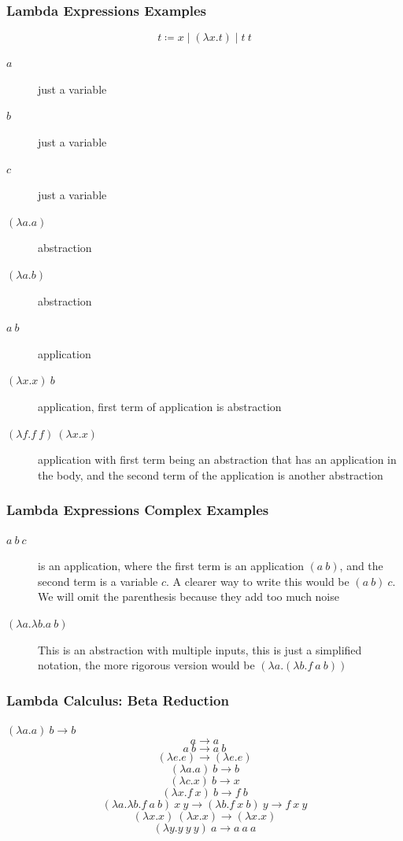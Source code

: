 \documentclass{beamer}
\begin{document}
\begin{frame}[fragile]
  \frametitle{Lambda Expressions Examples}

  $$ t \coloneqq x  \mid  (\lambda x . t)  \mid   t\  t $$

  \begin{description}
    \item[$a$] just a variable
    \item[$b$] just a variable
    \item[$c$] just a variable
    \item[$(\lambda a . a)$] abstraction
    \item[$(\lambda a . b)$] abstraction
    \item[$a\ b$] application
    \item[$(\lambda x . x)\ b$] application, first term of application is abstraction
    \item[$(\lambda f . f\ f)\ (\lambda x . x)$] application with first term being an abstraction that has an application in the body, and the second term of the application is another abstraction
  \end{description}
\end{frame}

\begin{frame}[fragile]
  \frametitle{Lambda Expressions Complex Examples}

  \begin{description}
    \item[$ a\ b\ c $] is an application, where the first term is an application $(a\ b)$, and the second term is a variable $c$. A clearer way to write this would be  $(a\ b)\ c$. We will omit the parenthesis because they add too much noise
    \item[$(\lambda a . \lambda b . a\ b) $] This is an abstraction with multiple inputs, this is just a simplified notation, the more rigorous version would be $(\lambda a . (\lambda b . f\ a\ b))$
  \end{description}
\end{frame}

\begin{frame}[fragile]
  \frametitle{Lambda Calculus: Beta Reduction}
  $(\lambda a . a)\ b \rightarrow b$
  $$ a \rightarrow a $$
  $$ a\ b \rightarrow a\ b$$
  $$ (\lambda e . e) \rightarrow (\lambda e . e) $$
  $$ (\lambda a . a)\ b \rightarrow b$$
  $$ (\lambda c . x)\ b \rightarrow x$$
  $$ (\lambda x . f\ x)\ b \rightarrow f\ b$$
  $$ (\lambda a . \lambda b . f\ a\ b)\ x\ y \rightarrow (\lambda b . f\ x\ b)\ y \rightarrow f\ x\ y$$
  $$ (\lambda x . x)\ (\lambda x . x) \rightarrow (\lambda x . x) $$
  $$ (\lambda y . y\ y\ y)\ a \rightarrow a\ a\ a$$
\end{frame}
\end{document}
